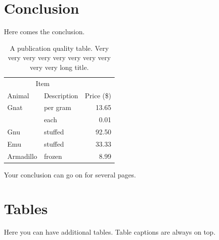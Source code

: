 \documentclass[msc,oneside]{ubcthesis}%
\begin{document}
\chapter{Conclusion}
Here comes the conclusion.
\begin{table}[tbph]
\centering
\caption{A publication quality table. Very very very very very very very very very very long title.
\label{table:food1}}
\begin{tabular}{@{}llr@{}} \toprule 
\multicolumn{2}{c}{Item} \\ \cmidrule(r){1-2} 
Animal & Description & Price (\$)\\ \midrule 
Gnat & per gram & 13.65 \\ 
& each & 0.01 \\ 
Gnu & stuffed & 92.50 \\ 
Emu & stuffed & 33.33 \\ 
Armadillo & frozen & 8.99 \\ \bottomrule 
\end{tabular}
\end{table}

\newpage
Your conclusion can go on for several pages.


%


\newpage %
\pagestyle{fancy}\rhead{}\cfoot{}\rfoot{\thepage}


%

\newpage
\pagestyle{headings}

\appendix 
\addappheadtotoc %
\appendixpage 



\chapter{Tables}
Here you can have additional tables. Table captions are always on top.
\end{document}
